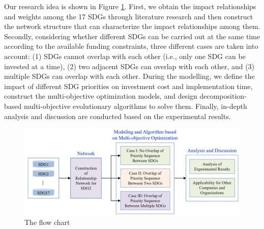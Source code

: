 \documentclass[10pt]{mcmthesis}
\begin{document}
Our research idea is shown in Figure \ref{fig.road}. First, we obtain the impact relationships and weights among the 17 SDGs through literature research and then construct the network structure that can characterize the impact relationships among them. Secondly, considering whether different SDGs can be carried out at the same time according to the available funding constraints, three different cases are taken into account: 
(1) SDGs cannot overlap with each other (i.e., only one SDG can be invested at a time), 
(2) two adjacent SDGs can overlap with each other, and 
(3) multiple SDGs can overlap with each other. During the modelling, we define the impact of different SDG priorities on investment cost and implementation time, construct the multi-objective optimization models, and design decomposition-based multi-objective evolutionary algorithms to solve them. Finally, in-depth analysis and discussion are conducted based on the experimental results.

\begin{figure}[h]
    \centering
    \includegraphics[width=16.0cm]{figures/road.png}
    \caption{ The flow chart }%
    \label{fig.road}
\end{figure} 
\vspace{-25pt}









\end{document}
